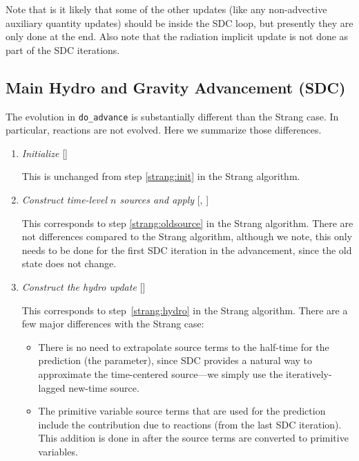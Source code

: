 Note that is it likely that some of the other updates (like any
non-advective auxiliary quantity updates) should be inside the SDC
loop, but presently they are only done at the end.  Also note that the
radiation implicit update is not done as part of the SDC iterations.


\subsection{Main Hydro and Gravity Advancement (SDC)}

The evolution in {\tt do\_advance} is substantially different than the
Strang case.  In particular, reactions are not evolved.  Here we
summarize those differences.

\begin{enumerate}
\item {\em Initialize} []

This is unchanged from step \ref{strang:init} in the Strang algorithm.


\item {\em Construct time-level $n$ sources and apply} 
  [, ]

This corresponds to step \ref{strang:oldsource} in the Strang
algorithm.  There are not differences compared to the Strang
algorithm, although we note, this only needs to be done for the first
SDC iteration in the advancement, since the old state does not change.

\item {\em Construct the hydro update} []

This corresponds to step~\ref{strang:hydro} in the Strang
algorithm.  There are a few major differences with the Strang case:
\begin{itemize}
\item There is no need to extrapolate source terms to the half-time
  for the prediction (the 
  parameter), since SDC provides a natural way to approximate the
  time-centered source---we simply use the iteratively-lagged new-time
  source.

\item The primitive variable source terms that are used for the
  prediction include the contribution due to reactions (from the last
  SDC iteration).  This addition is done in
   after the source terms are
  converted to primitive variables.
\end{itemize}


\end{enumerate}
